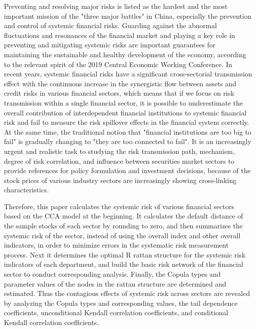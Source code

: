 \begin{eabstract}
  Preventing and resolving major risks is listed as the hardest and the most
important mission of the "three major battles" in China, especially the
prevention and control of systemic financial risks. Guarding against the
abnormal fluctuations and resonances of the financial market and playing a key
role in preventing and mitigating systemic risks are important guarantees for
maintaining the sustainable and healthy development of the economy, according to
the relevant spirit of the 2019 Central Economic Working Conference. In recent
years, systemic financial risks have a significant cross-sectorial transmission
effect with the continuous increase in the synergistic flow between assets and
credit risks in various financial sectors, which means that if we focus on risk
transmission within a single financial sector, it is possible to underestimate
the overall contribution of interdependent financial institutions to systemic
financial risk and fail to measure the risk spillover effects in the financial
system correctly. At the same time, the traditional notion that "financial
institutions are too big to fail" is gradually changing to "they are too
connected to fail". It is an increasingly urgent and realistic task to studying
the risk transmission path, mechanism, degree of risk correlation, and influence
between securities market sectors to provide references for policy formulation
and investment decisions, because of the stock prices of various industry
sectors are increasingly showing cross-linking characteristics.

Therefore, this paper calculates the systemic risk of various financial sectors
based on the CCA model at the beginning. It calculates the default distance of
the sample stocks of each sector by rounding to zero, and then summarizes the
systemic risk of the sector, instead of using the overall index and other
overall indicators, in order to minimize errors in the systematic risk
measurement process. Next it determines the optimal R rattan structure for the
systemic risk indicators of each department, and build the basic risk network of
the financial sector to conduct corresponding analysis. Finally, the Copula
types and parameter values of the nodes in the rattan structure are determined
and estimated. Thus the contagious effects of systemic risk across sectors are
revealed by analyzing the Copula types and corresponding values, the tail
dependence coefficients, unconditional Kendall correlation coefficients, and
conditional Kendall correlation coefficients.


\end{eabstract}
